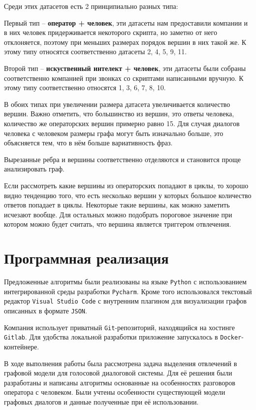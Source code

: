\documentclass[specification,annotation]{itmo-student-thesis}
\begin{document}
	Среди этих датасетов есть 2 принципиально разных типа:
	
	Первый тип -- \textbf{оператор + человек}, эти датасеты нам предоставили компании и в них человек придерживается некоторого скрипта, но заметно от него отклоняется, поэтому при меньших размерах порядок вершин в них такой же. К этому типу относятся соответственно датасеты 2, 4, 5, 9, 11.
	
	Второй тип -- \textbf{искуственный интелект + человек}, эти датасеты были собраны соответственно компанией при звонках со скриптами написанными вручную. К этому типу соответственно относятся 1, 3, 6, 7, 8, 10.
	
	В обоих типах при увеличении размера датасета увеличивается количество вершин. Важно отметить, что большинство из вершин, это ответы человека, количество же операторских вершин примерно равно 15. Для случая диалогов человека с человеком размеры графа могут быть изначально больше, это объясняется тем, что в нём больше вариативность фраз.
	
	Вырезанные ребра и вершины соответственно отделяются и становится проще анализировать граф.
	
	Если рассмотреть какие вершины из операторских попадают в циклы, то хорошо видно тенденцию того, что есть несколько вершин у которых большое количество ответов попадает в циклы. Некоторые такие вершины, как можно заметить исчезают вообще. Для остальных можно подобрать пороговое значение при котором можно будет считать, что вершина является триггером отвлечения.
	\section{Программная реализация}
	Предложенные алгоритмы были реализованы на языке \texttt{Python} с использованием интегрированной среды разработки \texttt{Pycharm}. Кроме того использовался текстовый редактор \texttt{Visual Studio Code} с внутренним плагином для визуализации графов описанных в формате \texttt{JSON}.
	
	Компания использует приватный \texttt{Git}-репозиторий, находящийся на хостинге \texttt{Gitlab}. Для удобства локальной разработки приложение запускалось в \texttt{Docker}-контейнере.
	
	\startconclusionpage{}
	В ходе выполнения работы была рассмотрена задача выделения отвлечений в графовой модели для голосовой диалоговой системы. Для её решения были разработаны и написаны алгоритмы основанные на особенностях разговоров оператора с человеком. Были учтены особенности существующей модели графовых диалогов и данные полученные при её использовании.
	
\end{document}
